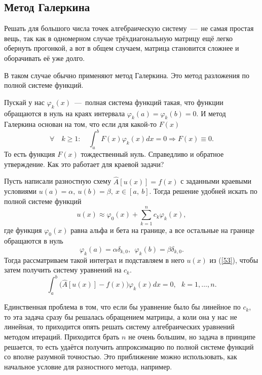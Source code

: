 \documentclass[a4paper,9pt,russian]{article}
\begin{document}
\subsection{Метод Галеркина}
    Решать для большого числа точек алгебраическую систему~---~не самая простая вещь, так как в одномерном случае трёхдиагональную матрицу ещё легко обернуть прогонкой, а вот в общем случаем, матрица становится сложнее и оборачивать её уже долго.\par
    В таком случае обычно применяют метод Галеркина. {Это метод разложения по полной системе функций.}\par
    Пускай у нас $\varphi_k (x)$~---~полная система функций такая, что функции обращаются в нуль на краях интервала $\varphi_k (a) =\varphi_k (b) = 0$. И метод Галеркина основан на том, что если для какой-то $F(x)$
    \begin{equation}
     \forall \quad k\ge1: \quad\int_a^b F(x)\varphi_k (x)dx=0 \Rightarrow F(x) \equiv 0.
    \end{equation}
    То есть функция $F(x)$ тождественный нуль. Справедливо и обратное утверждение. Как это работает для краевой задачи?\par
    Пусть написали разностную схему $\hat A [u(x)]=f(x)$ с заданными краевыми условиями $u(a)=\alpha,\  u(b) = \beta, \ x \in [a,\ b]$. Тогда решение удобней искать по полной системе функций
    \begin{equation}\label{53}
     u(x) \approx \varphi_0(x) + \sum_{k=1}^nc_k\varphi_k(x),
    \end{equation}
    где функция $\varphi_0(x)$ равна альфа и бета на границе, а все остальные на границе обращаются в нуль 
    \begin{equation}
     \varphi_k(a)=\alpha\delta_{k,0},\ \ \varphi_k(b)=\beta\delta_{k,0}.
    \end{equation}
    Тогда рассматриваем такой интеграл и подставляем в него $u(x)$ из (\ref{53}), чтобы затем получить систему уравнений на $c_k$.
    \begin{equation}
     \int_a^b \biggl(\hat A [u(x)] - f(x)\biggr)\varphi_k(x)dx = 0,\ \ \ k=1,\ldots,n.
    \end{equation}\par
    Единственная проблема в том, что если бы уравнение было бы линейное по $c_k$, то эта задача сразу бы решалась обращением матрицы, а коли она у нас не линейная, то приходится опять решать систему алгебраических уравнений методом итераций. Приходится брать $n$ не очень большим, но задача в принципе решается, то есть удаётся получить аппроксимацию по полной системе функций со вполне разумной точностью. Это приближение можно использовать, как начальное условие для разностного метода, например.
\end{document}
